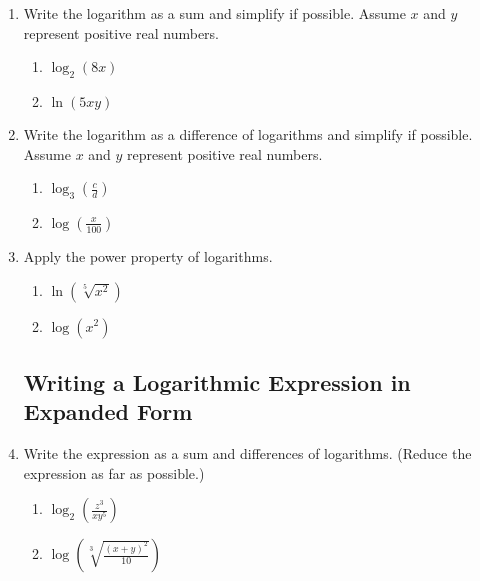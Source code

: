 \begin{enumerate}
\item Write the logarithm as a sum and simplify if possible.  Assume $x$ and $y$ represent positive real numbers. \\
\begin{enumerate}
\item $\log_2 (8x)$
  \vfill
\item $\ln (5xy)$
  \vfill
\end{enumerate}

\clearpage

\noindent
{}



\item Write the logarithm as a difference of logarithms and simplify
  if possible.  Assume $x$ and $y$ represent positive real numbers.
\begin{enumerate}
\item $\displaystyle \log_3 \left(\frac{c}{d}\right)$
  \vfill
\item $\displaystyle \log \left(\frac{x}{100}\right)$
  \vfill
\end{enumerate}


\noindent
{}


\item Apply the power property of logarithms.
\begin{enumerate}
\item $\displaystyle\ln\left(\sqrt[5]{x^2}\right)$
  \vfill
\item $\displaystyle \log\left(x^2\right)$
  \vfill
\end{enumerate}



\subsection{Writing a Logarithmic Expression in Expanded Form}

\item Write the expression as a sum and differences of
  logarithms. (Reduce the expression as far as possible.)
\begin{enumerate}
\item $\displaystyle \log_2 \left(\frac{z^3}{xy^5}\right)$
  \vfill
\item $\displaystyle \log \left(\sqrt[3]{\frac{(x+y)^2}{10}}\right)$
  \vfill
\end{enumerate}


\end{enumerate}
